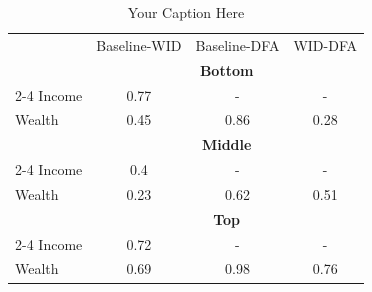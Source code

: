\begin{table}[h!]
\centering
\begin{tabular}{l c c c}
\toprule\toprule
& \multicolumn{1}{c}{Baseline-WID} & \multicolumn{1}{c}{Baseline-DFA} & \multicolumn{1}{c}{WID-DFA}\\
      & \multicolumn{3}{c}{\textbf{Bottom}} \\
    \cmidrule(lr){2-4}
Income& 0.77 & - & - \\
Wealth& 0.45 & 0.86 & 0.28 \\
      & \multicolumn{3}{c}{\textbf{Middle}} \\
    \cmidrule(lr){2-4}
Income& 0.4 & - & - \\
Wealth& 0.23 & 0.62 & 0.51 \\
      & \multicolumn{3}{c}{\textbf{Top}} \\
    \cmidrule(lr){2-4}
Income& 0.72 & - & - \\
Wealth& 0.69 & 0.98 & 0.76 \\
\bottomrule\bottomrule
\end{tabular}
\caption{Your Caption Here}
\label{tab:your_label}
\end{table}
